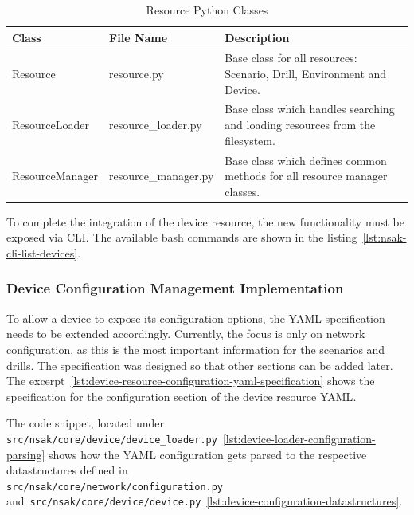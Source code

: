 \begin{table}[h]
    \centering
    \begin{tabularx}{\textwidth}{llX}
        \hline
        \textbf{Class} & \textbf{File Name} & \textbf{Description} \\
        \hline
        Resource & resource.py & Base class for all resources: Scenario, Drill, Environment and Device. \\
        ResourceLoader & resource\_loader.py & Base class which handles searching and loading resources from the filesystem. \\
        ResourceManager & resource\_manager.py & Base class which defines common methods for all resource manager classes. \\
        \hline
    \end{tabularx}
    \caption{Resource Python Classes}
    \label{tab:resource-base-classes}
\end{table}

To complete the integration of the device resource, the new functionality must be exposed via \gls{CLI}.
The available bash commands are shown in the listing~\ref{lst:nsak-cli-list-devices}.



\subsubsection{Device Configuration Management Implementation}\label{subsubsec:device-configuration-management-implementation}

To allow a device to expose its configuration options, the \gls{YAML} specification needs to be extended accordingly.
Currently, the focus is only on network configuration, as this is the most important information for the scenarios and drills.
The specification was designed so that other sections can be added later.
The excerpt~\ref{lst:device-resource-configuration-yaml-specification} shows the specification for the configuration section of the device resource \gls{YAML}.


The code snippet, located under \texttt{src/nsak/core/device/device_loader.py}~\ref{lst:device-loader-configuration-parsing}
shows how the \gls{YAML} configuration gets parsed to the respective datastructures defined in\\
\texttt{src/nsak/core/network/configuration.py}
and~\texttt{src/nsak/core/device/device.py}~\ref{lst:device-configuration-datastructures}.


